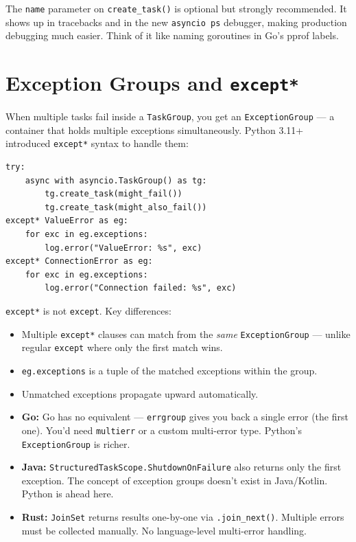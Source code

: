 \documentclass[11pt,a4paper,oneside]{book}
\newcommand{\py}[1]{\texttt{\color{pyblue}#1}}
\newcommand{\gocode}[1]{\texttt{\color{goblue}#1}}
\newcommand{\rustcode}[1]{\texttt{\color{BrickRed}#1}}
\newcommand{\javacode}[1]{\texttt{\color{javaorange!80!black}#1}}
\begin{document}
\begin{infobox}
The \py{name} parameter on \py{create\_task()} is optional but strongly recommended. It shows up
in tracebacks and in the new \texttt{asyncio ps} debugger, making production debugging
much easier. Think of it like naming goroutines in Go's pprof labels.
\end{infobox}

\section{Exception Groups and \py{except*}}

When multiple tasks fail inside a \py{TaskGroup}, you get an \py{ExceptionGroup} ---
a container that holds multiple exceptions simultaneously. Python 3.11+ introduced
\py{except*} syntax to handle them:

\begin{lstlisting}[style=python]
try:
    async with asyncio.TaskGroup() as tg:
        tg.create_task(might_fail())
        tg.create_task(might_also_fail())
except* ValueError as eg:
    for exc in eg.exceptions:
        log.error("ValueError: %s", exc)
except* ConnectionError as eg:
    for exc in eg.exceptions:
        log.error("Connection failed: %s", exc)
\end{lstlisting}

\begin{warningbox}
\py{except*} is not \py{except}. Key differences:
\begin{itemize}
    \item Multiple \py{except*} clauses can match from the \emph{same} \py{ExceptionGroup}
          --- unlike regular \py{except} where only the first match wins.
    \item \py{eg.exceptions} is a tuple of the matched exceptions within the group.
    \item Unmatched exceptions propagate upward automatically.
\end{itemize}
\end{warningbox}

\begin{analogybox}
\begin{itemize}
    \item \textcolor{goblue}{\textbf{Go:}} Go has no equivalent --- \gocode{errgroup} gives you
          back a single error (the first one). You'd need \texttt{multierr} or a custom
          multi-error type. Python's \py{ExceptionGroup} is richer.
    \item \textcolor{javaorange}{\textbf{Java:}} \javacode{StructuredTaskScope.ShutdownOnFailure}
          also returns only the first exception. The concept of exception groups doesn't exist in
          Java/Kotlin. Python is ahead here.
    \item \textcolor{BrickRed}{\textbf{Rust:}} \rustcode{JoinSet} returns results one-by-one via
          \texttt{.join\_next()}. Multiple errors must be collected manually. No language-level
          multi-error handling.
\end{itemize}
\end{analogybox}
\end{document}
